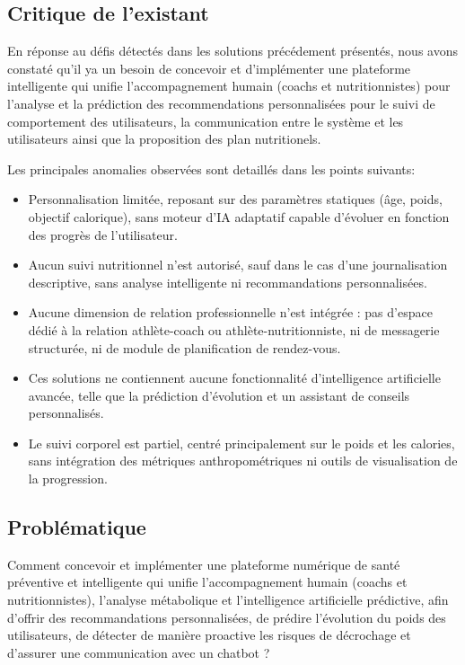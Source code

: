 ﻿\documentclass[a4paper,12pt]{report}
\begin{document}
\subsection{Critique de l'existant }
En réponse au défis détectés dans les solutions précédement présentés, nous avons constaté qu'il ya un besoin de  concevoir et d'implémenter une plateforme intelligente qui unifie l'accompagnement humain (coachs et nutritionnistes) pour l'analyse 
et la prédiction des recommendations personnalisées pour le suivi de comportement des utilisateurs, la communication entre le système et les utilisateurs ainsi que la proposition des plan nutritionels.

Les principales anomalies observées sont detaillés dans  les points suivants:

\begin{itemize}
 \item  Personnalisation limitée, reposant sur des paramètres statiques (âge, poids, objectif calorique),
 sans moteur d'IA adaptatif capable d'évoluer en fonction des progrès de l'utilisateur.
 \item Aucun suivi nutritionnel n'est autorisé, sauf dans le cas d'une journalisation descriptive, 
 sans analyse intelligente ni recommandations personnalisées.
 \item Aucune dimension de relation professionnelle n'est intégrée : pas d'espace dédié à la relation athlète-coach ou athlète-nutritionniste, 
 ni de messagerie structurée, ni de module de planification de rendez-vous.
 \item Ces solutions ne contiennent aucune fonctionnalité d'intelligence artificielle avancée, telle que la prédiction d'évolution et  un assistant de conseils personnalisés.
 \item Le suivi corporel est partiel, centré principalement sur le poids et les calories, sans intégration des métriques
 anthropométriques ni outils de visualisation de la progression.
 \end{itemize}

\subsection{Problématique}
Comment concevoir et implémenter une plateforme numérique de santé préventive et intelligente qui unifie l'accompagnement humain (coachs et nutritionnistes), l'analyse métabolique et l'intelligence artificielle prédictive, afin d'offrir des recommandations personnalisées, de prédire l'évolution du poids des utilisateurs, de détecter de manière proactive les risques de décrochage et d'assurer une communication avec un chatbot ?
\end{document}
